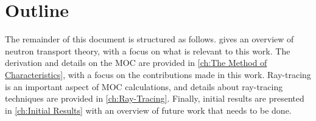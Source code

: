 {    \section{Outline}{\label{sec:Introduction:Outline}
        The remainder of this document is structured as follows.
         gives an overview of neutron transport theory, with a focus on what is relevant to this work.
        The derivation and details on the \acf{MOC} are provided in \cref{ch:The Method of Characteristics}, with a focus on the contributions made in this work.
        Ray-tracing is an important aspect of \acf{MOC} calculations, and details about ray-tracing techniques are provided in \cref{ch:Ray-Tracing}.
        Finally, initial results are presented in \cref{ch:Initial Results} with an overview of future work that needs to be done.
    }
}